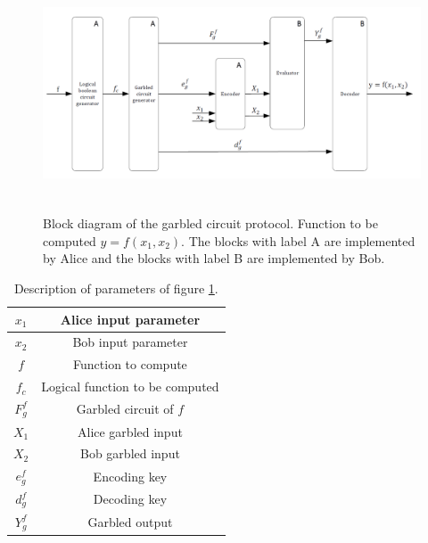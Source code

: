 \begin{refsection}
\begin{figure}[H]
	\centering
	\includegraphics[width=1\textwidth, height=7cm]{./sdf/secure_multiparty_computation/figures/garbled_circuit.png}
    \caption{Block diagram of the garbled circuit protocol. Function to be computed $y=f(x_1, x_2)$. The blocks with label A are implemented by Alice and the blocks with label B are implemented by Bob.}\label{fig:garbledcircuit}
\end{figure}


\begin{table}[H]
\centering

\begin{tabular}{|c|c|}
\hline
$x_1$                   & Alice input parameter             \\ \hline
$x_2$                   & Bob input parameter               \\ \hline
$f$                     & Function to compute               \\ \hline
$f_c$                   & Logical function to be computed   \\ \hline
$F_g^f$                 & Garbled circuit of $f$            \\ \hline
$X_1$                   & Alice garbled input               \\ \hline
$X_2$                   & Bob garbled input                 \\ \hline
$e_g^f$                 & Encoding key                      \\ \hline
$d_g^f$                 & Decoding key                      \\ \hline
$Y_g^f$                 & Garbled output                    \\ \hline
\end{tabular}
\caption{Description of parameters of figure \ref{fig:garbledcircuit}.}
\end{table}





\end{refsection}

